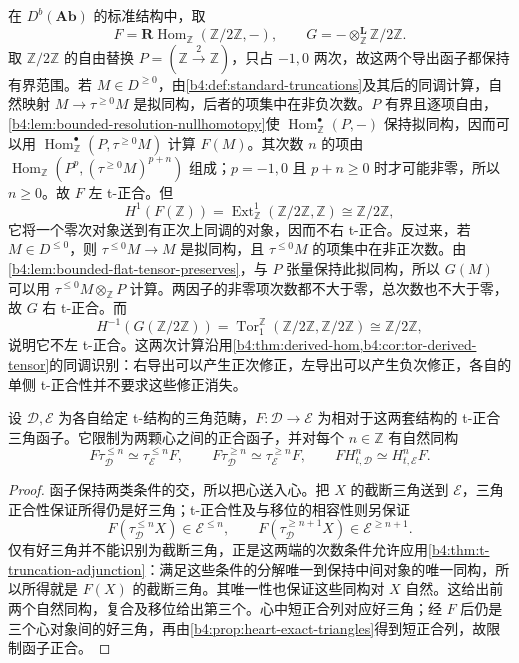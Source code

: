 \ProseParagraphBreak
在 \(D^b(\mathbf{Ab})\) 的标准结构中，取
\[
	F=\mathbf R\operatorname{Hom}_{\mathbb Z}(\mathbb Z/2\mathbb Z,-), \qquad G=-\otimes_{\mathbb Z}^{\mathbf L}\mathbb Z/2\mathbb Z.
\]
取 \(\mathbb Z/2\mathbb Z\) 的自由替换 \(P=(\mathbb Z\xrightarrow{2}\mathbb Z)\)，只占 \(-1,0\) 两次，故这两个导出函子都保持有界范围。若 \(M\in D^{\ge0}\)，由\cref{b4:def:standard-truncations}及其后的同调计算，自然映射 \(M\to\tau^{\ge0}M\) 是拟同构，后者的项集中在非负次数。\(P\) 有界且逐项自由，\cref{b4:lem:bounded-resolution-nullhomotopy}使 \(\operatorname{Hom}^{\bullet}_{\mathbb Z}(P,-)\) 保持拟同构，因而可以用 \(\operatorname{Hom}^{\bullet}_{\mathbb Z}(P,\tau^{\ge0}M)\) 计算 \(F(M)\)。其次数 \(n\) 的项由 \(\operatorname{Hom}_{\mathbb Z}(P^p,(\tau^{\ge0}M)^{p+n})\) 组成；\(p=-1,0\) 且 \(p+n\ge0\) 时才可能非零，所以 \(n\ge0\)。故 \(F\) 左 t-正合。但
\[
	H^1(F(\mathbb Z)) =\operatorname{Ext}_{\mathbb Z}^1(\mathbb Z/2\mathbb Z,\mathbb Z) \cong\mathbb Z/2\mathbb Z,
\]
它将一个零次对象送到有正次上同调的对象，因而不右 t-正合。反过来，若 \(M\in D^{\le0}\)，则 \(\tau^{\le0}M\to M\) 是拟同构，且 \(\tau^{\le0}M\) 的项集中在非正次数。由\cref{b4:lem:bounded-flat-tensor-preserves}，与 \(P\) 张量保持此拟同构，所以 \(G(M)\) 可以用 \(\tau^{\le0}M\otimes_{\mathbb Z}P\) 计算。两因子的非零项次数都不大于零，总次数也不大于零，故 \(G\) 右 t-正合。而
\[
	H^{-1}(G(\mathbb Z/2\mathbb Z)) =\operatorname{Tor}_1^{\mathbb Z}(\mathbb Z/2\mathbb Z,\mathbb Z/2\mathbb Z) \cong\mathbb Z/2\mathbb Z,
\]
说明它不左 t-正合。这两次计算沿用\cref{b4:thm:derived-hom,b4:cor:tor-derived-tensor}的同调识别：右导出可以产生正次修正，左导出可以产生负次修正，各自的单侧 t-正合性并不要求这些修正消失。

\begin{proposition}\label{b4:prop:t-exact-heart}
	设 \(\mathcal D,\mathcal E\) 为各自给定 t-结构的三角范畴，\(F:\mathcal D\to\mathcal E\) 为相对于这两套结构的 t-正合三角函子。它限制为两颗心之间的正合函子，并对每个 \(n\in\mathbb Z\) 有自然同构
	\[
		F\tau_{\mathcal D}^{\le n}\simeq\tau_{\mathcal E}^{\le n}F, \qquad F\tau_{\mathcal D}^{\ge n}\simeq\tau_{\mathcal E}^{\ge n}F, \qquad F H_{t,\mathcal D}^n\simeq H_{t,\mathcal E}^nF.
	\]
\end{proposition}
\begin{proof}
	函子保持两类条件的交，所以把心送入心。把 \(X\) 的截断三角送到 \(\mathcal E\)，三角正合性保证所得仍是好三角；t-正合性及与移位的相容性则另保证
	\[
		F(\tau_{\mathcal D}^{\le n}X)\in\mathcal E^{\le n}, \qquad F(\tau_{\mathcal D}^{\ge n+1}X)\in\mathcal E^{\ge n+1}.
	\]
	仅有好三角并不能识别为截断三角，正是这两端的次数条件允许应用\cref{b4:thm:t-truncation-adjunction}：满足这些条件的分解唯一到保持中间对象的唯一同构，所以所得就是 \(F(X)\) 的截断三角。其唯一性也保证这些同构对 \(X\) 自然。这给出前两个自然同构，复合及移位给出第三个。心中短正合列对应好三角；经 \(F\) 后仍是三个心对象间的好三角，再由\cref{b4:prop:heart-exact-triangles}得到短正合列，故限制函子正合。
\end{proof}

